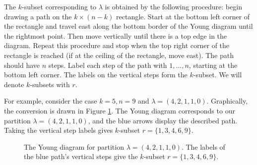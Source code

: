 \documentclass[12pt]{article}
\theoremstyle{plain}
\theoremstyle{definition}
\begin{document}
The $k$-subset corresponding to $\lambda$ is obtained by the following procedure: begin drawing a path on the $k\times(n-k)$ rectangle. Start at the bottom left corner of the rectangle and travel east along the bottom border of the Young diagram until the rightmost point. Then move vertically until there is a top edge in the diagram. Repeat this procedure and stop when the top right corner of the rectangle is reached (if at the ceiling of the rectangle, move east). The path should have $n$ steps. Label each step of the path with $1,\dots,n$, starting at the bottom left corner. The labels on the vertical steps form the $k$-subset. We will denote $k$-subsets with $r$.


For example, consider the case $k=5,n=9$ and $\lambda = (4,2,1,1,0)$. Graphically, the conversion is drawn in Figure \ref{fig: convert partition to subset}. The Young diagram corresponds to our partition $\lambda = (4,2,1,1,0)$, and the blue arrows display the described path. Taking the vertical step labels gives $k$-subset $r = \{ 1, 3, 4, 6, 9 \}$.


\begin{figure}[ht]
    \centering
    \caption{The Young diagram for partition $\lambda = (4,2,1,1,0)$. The labels of the blue path's vertical steps give the $k$-subset $r = \{ 1, 3, 4, 6, 9 \}$.}
    \label{fig: convert partition to subset}
\end{figure}
 
\end{document}
